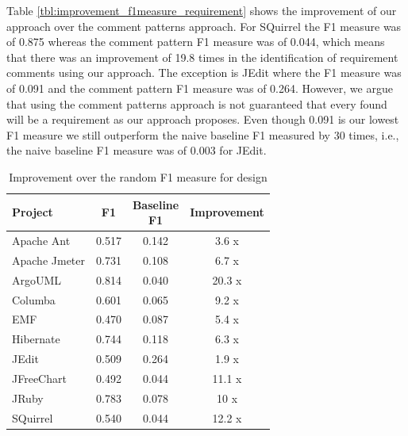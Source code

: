 Table \ref{tbl:improvement_f1measure_requirement} shows the improvement of our approach over the comment patterns approach. For SQuirrel the F1 measure was of 0.875 whereas the comment pattern F1 measure was of 0.044, which means that there was an improvement of 19.8 times in the identification of requirement \SATD comments using our approach. The exception is JEdit where the F1 measure was of 0.091 and the comment pattern F1 measure was of 0.264. However, we argue that using the comment patterns approach is not guaranteed that every \SATD found will be a requirement \SATD as our approach proposes. Even though 0.091 is our lowest F1 measure we still outperform the naive baseline F1 measured by 30 times, i.e., the naive baseline F1 measure was of 0.003 for JEdit. 

\begin{table}[!thb]
    \begin{center}
        \caption{Improvement over the random F1 measure for design}
        \label{tbl:improvement_f1measure_design}
        \begin{tabular}{l| c c c }
        \toprule
        \textbf{Project} & \textbf{F1} & \thead{Baseline\\F1} & \textbf{Improvement}\\
        \midrule
         Apache Ant      &  0.517 &  0.142  &  3.6  x\\
         Apache Jmeter   &  0.731 &  0.108  &  6.7  x\\
         ArgoUML         &  0.814 &  0.040  &  20.3 x\\
         Columba         &  0.601 &  0.065  &  9.2  x\\
         EMF             &  0.470 &  0.087  &  5.4  x\\
         Hibernate       &  0.744 &  0.118  &  6.3  x\\
         JEdit           &  0.509 &  0.264  &  1.9  x\\
         JFreeChart      &  0.492 &  0.044  &  11.1 x\\
         JRuby           &  0.783 &  0.078  &  10   x\\
         SQuirrel        &  0.540 &  0.044  &  12.2 x\\
        \bottomrule
        \end{tabular}
    \end{center}    
\end{table}

